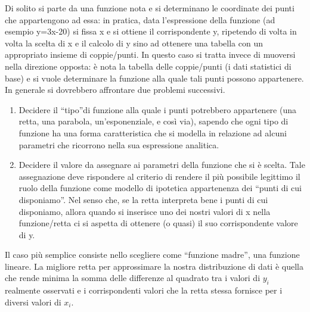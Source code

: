  Di solito si parte da una funzione nota e si determinano le coordinate dei 
punti che appartengono ad essa: in pratica, data l'espressione della 
funzione (ad esempio y=3x-20) si fissa x e si ottiene il corrispondente y, 
ripetendo di volta in volta la  scelta di x e il calcolo di y  sino ad 
ottenere una tabella con un  appropriato insieme di coppie/punti. 
 In questo caso si tratta invece di muoversi nella direzione opposta: è 
nota la tabella delle coppie/punti (i dati statistici di base) e si vuole 
determinare la funzione alla quale tali punti possono appartenere.
 In generale si dovrebbero affrontare due problemi successivi. 
 \begin{enumerate}
        \item Decidere il \textquotedblleft tipo\textquotedblright di 
funzione alla quale i punti potrebbero appartenere (una retta, una parabola, 
un'esponenziale, e così via), sapendo che ogni tipo di funzione ha una 
forma caratteristica che si modella in relazione ad alcuni parametri che 
ricorrono nella sua espressione analitica. 
        \item Decidere  il valore da assegnare ai parametri della funzione 
che si è scelta. Tale assegnazione deve rispondere al criterio di rendere 
il più possibile legittimo il ruolo della funzione come modello di 
ipotetica appartenenza dei \textquotedblleft punti di cui 
disponiamo\textquotedblright. Nel senso che, se la retta interpreta bene i 
punti di cui disponiamo, allora quando si inserisce uno dei nostri valori 
di x nella funzione/retta ci si aspetta di ottenere (o quasi) il suo 
corrispondente valore di y.
 \end{enumerate}
Il caso più semplice consiste nello scegliere come ``funzione madre'', 
una funzione lineare.
La migliore retta per approssimare la nostra distribuzione di dati è quella 
che rende minima la somma delle differenze al quadrato tra i valori di 
\(y_i\) realmente osservati e i corrispondenti valori che la retta stessa 
fornisce per i diversi valori di \(x_i\).
